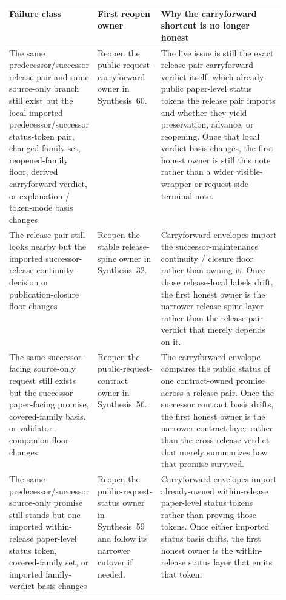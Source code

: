 \documentclass[11pt]{article}
\begin{document}
\begin{table}[t]
\centering
\small
\begin{tabularx}{\linewidth}{@{}p{0.30\linewidth}p{0.23\linewidth}X@{}}
\toprule
Failure class & First reopen owner & Why the carryforward shortcut is no longer honest \\
\midrule
The same predecessor/successor release pair and same source-only branch still exist but the local imported predecessor/successor status-token pair, changed-family set, reopened-family floor, derived carryforward verdict, or explanation / token-mode basis changes & Reopen the public-request-carryforward owner in Synthesis~60. & The live issue is still the exact release-pair carryforward verdict itself: which already-public paper-level status tokens the release pair imports and whether they yield preservation, advance, or reopening. Once that local verdict basis changes, the first honest owner is still this note rather than a wider visible-wrapper or request-side terminal note. \\
The release pair still looks nearby but the imported successor-release continuity decision or publication-closure floor changes & Reopen the stable release-spine owner in Synthesis~32. & Carryforward envelopes import the successor-maintenance continuity / closure floor rather than owning it. Once those release-local labels drift, the first honest owner is the narrower release-spine layer rather than the release-pair verdict that merely depends on it. \\
The same successor-facing source-only request still exists but the successor paper-facing promise, covered-family basis, or validator-companion floor changes & Reopen the public-request-contract owner in Synthesis~56. & The carryforward envelope compares the public status of one contract-owned promise across a release pair. Once the successor contract basis drifts, the first honest owner is the narrower contract layer rather than the cross-release verdict that merely summarizes how that promise survived. \\
The same predecessor/successor source-only promise still stands but one imported within-release paper-level status token, covered-family set, or imported family-verdict basis changes & Reopen the public-request-status owner in Synthesis~59 and follow its narrower cutover if needed. & Carryforward envelopes import already-owned within-release paper-level status tokens rather than proving those tokens. Once either imported status basis drifts, the first honest owner is the within-release status layer that emits that token. \\

\end{tabularx}
\end{table}
\end{document}
